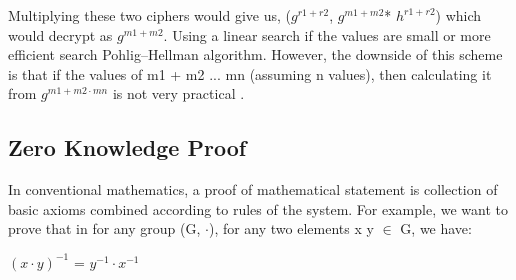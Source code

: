 	      Multiplying these two ciphers would give us,  ($g^{r1 + r2}$, $g^{m1 + m2} $* $ h^{r1 + r2}$) which would decrypt as 
	      $g^{m1 + m2}$. Using a linear search if the values are small or more efficient search Pohlig–Hellman algorithm. However, the downside 
	      of this scheme is that if the values of m1 + m2 ... mn (assuming n values), then calculating it from $g^{m1 + m2 \cdot mn}$ is 
	      not very practical \citep{10.1007/3-540-69053-0_9}. 
	     
     \subsection{Zero Knowledge Proof}
      In conventional mathematics, a proof of mathematical statement is collection of basic axioms combined according to rules of 
      the system. For example, we want to prove that in for any group (G, $\cdot$), for any two elements x y $\in$ G, we have:
      \begin{displayquote}
		 
		 $(x \cdot y)^{-1}$ = $y^{-1} \cdot x^{-1}$
		
	    \end{displayquote}
      
